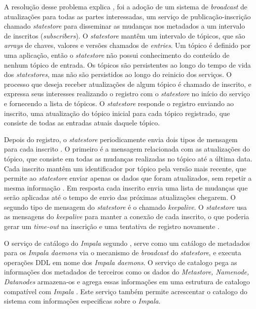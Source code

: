             A resolução desse problema explica \cite{russell2013}, foi a adoção de um sistema de \textit{broadcast} de atualizações
            para todas as partes interessadas, um serviço de publicação-inscrição chamado \textit{statestore} para disseminar as
            mudanças nos metadados a um intervalo de inscritos (\textit{subscribers}). O \textit{statestore} mantêm um intervalo
            de tópicos, que são \textit{arrays} de chaves, valores e versões chamados de \textit{entries}. Um tópico é definido por
            uma aplicação, então o \textit{statestore} não possui conhecimento do conteúdo de nenhum tópico de entrada. Os tópicos
            são persistentes ao longo do tempo de vida dos \textit{statestores}, mas não são persistidos ao longo do reinicio dos serviços.
            O processo que deseja receber atualizações de algum tópico é chamado de inscrito, e expressa seus interesses realizando o
            registro com o \textit{statestore} no início do serviço e fornecendo a lista de tópicos. O \textit{statestore} responde o
            registro enviando ao inscrito, uma atualização do tópico inicial para cada tópico registrado, que consiste de todas as
            entradas atuais daquele tópico.

            Depois do registro, o \textit{statestore} periodicamente envia dois tipos de mensagem para cada inscrito \cite{bittorf2015}.
            O primeiro é a mensagem relacionada com as atualizações do tópico, que consiste em todas as mudanças realizadas no
            tópico até a última data. Cada inscrito mantêm um identificador por tópico pela versão mais recente, que permite ao
            \textit{statestore} enviar apenas os dados que foram atualizados, sem repetir a mesma informação \cite{bittorf2015}.
            Em resposta cada inscrito envia uma lista de mudanças que serão aplicadas até o tempo de envio das próximas
            atualizações chegarem. O segundo tipo de mensagem do \textit{statestore} é o chamado \textit{keepalive}.
            O \textit{statestore} usa as mensagens do \textit{keepalive} para manter a conexão de cada inscrito, o que poderia
            gerar um \textit{time-out} na inscrição e uma tentativa de registro novamente \cite{bittorf2015}.

            O serviço de catálogo do \textit{Impala} segundo , serve como um catálogo de metadados para
            os \textit{Impala daemons} via o mecanismo de \textit{broadcast} do \textit{statestore}, e executa operações DDL em
            nome dos \textit{Impala daemons}. O serviço de catalogo pega as informações dos metadados de terceiros como os
            dados do \textit{Metastore, Namenode, Datanodes} armazena-os e agrega essas informações em uma estrutura de
            catalogo compatível com \textit{Impala} \cite{chauhan2013}. Este serviço também permite acrescentar o catalogo do
            sistema com informações especificas sobre o \textit{Impala}.

